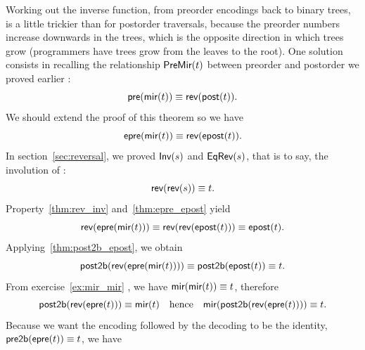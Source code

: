 Working out the inverse function, from preorder encodings back to
binary trees, is a little trickier than for postorder traversals,
because the preorder numbers increase downwards in the trees, which is
the opposite direction in which trees grow (programmers have trees
grow from the leaves to the root). One solution consists in recalling
the relationship \(\textsf{PreMir}({t})\)
between preorder and postorder we proved earlier
:
\begin{equation*}
\textsf{pre}(\textsf{mir}(t)) \equiv \textsf{rev}(\textsf{post}(t)).
\end{equation*}
We should extend the proof of this theorem so we have
\begin{equation}
\fun{epre}(\fun{mir}(t)) \equiv \fun{rev}(\fun{epost}(t)).
\label{thm:epre_epost}
\index{rev@\fun{rev/1}}
\end{equation}
In section~\ref{sec:reversal}, we proved
\(\textsf{Inv}({s})\) and
\(\textsf{EqRev}({s})\), that is to say, the
involution of
:
\begin{equation}
\textsf{rev}(\textsf{rev}(s)) \equiv t.
\label{thm:rev_inv}
\end{equation}
Property~\eqref{thm:rev_inv} and~\eqref{thm:epre_epost} yield
\begin{equation*}
\textsf{rev}(\textsf{epre}(\textsf{mir}(t))) \equiv
\textsf{rev}(\textsf{rev}(\textsf{epost}(t))) \equiv \textsf{epost}(t).
\end{equation*}
Applying~\eqref{thm:post2b_epost}, we obtain
\begin{equation*}
\textsf{post2b}(\textsf{rev}(\textsf{epre}(\textsf{mir}(t)))) \equiv
\textsf{post2b}(\textsf{epost}(t)) \equiv t.
\end{equation*}
From exercise~\ref{ex:mir_mir} , we have
\(\textsf{mir}(\textsf{mir}(t)) \equiv t\), therefore
\begin{equation*}
\textsf{post2b}(\textsf{rev}(\textsf{epre}(t))) \equiv \textsf{mir}(t)
\quad\text{hence}\quad
\textsf{mir}(\textsf{post2b}(\textsf{rev}(\textsf{epre}(t)))) \equiv t.
\end{equation*}
Because we want the encoding followed by the decoding to be the
identity, \(\textsf{pre2b}(\textsf{epre}(t)) \equiv t\), we have
